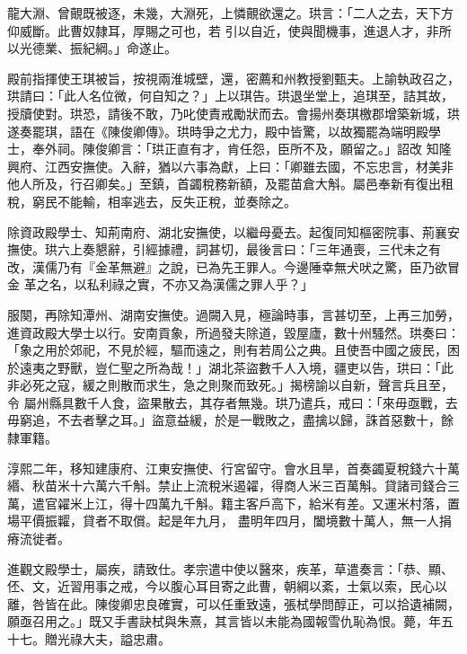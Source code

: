 \begin{pinyinscope}
 龍大淵、曾覿既被逐，未幾，大淵死，上憐覿欲還之。珙言：「二人之去，天下方仰威斷。此曹奴隸耳，厚賜之可也，若
 引以自近，使與聞機事，進退人才，非所以光德業、振紀綱。」命遂止。



 殿前指揮使王琪被旨，按視兩淮城壁，還，密薦和州教授劉甄夫。上諭執政召之，珙請曰：「此人名位微，何自知之？」上以琪告。珙退坐堂上，追琪至，詰其故，授牘使對。珙恐，請後不敢，乃叱使責戒勵狀而去。會揚州奏琪檄郡增築新城，珙遂奏罷琪，語在《陳俊卿傳》。珙時爭之尤力，殿中皆驚，以故獨罷為端明殿學士，奉外祠。陳俊卿言：「珙正直有才，肯任怨，臣所不及，願留之。」詔改
 知隆興府、江西安撫使。入辭，猶以六事為獻，上曰：「卿雖去國，不忘忠言，材美非他人所及，行召卿矣。」至鎮，首蠲稅務新額，及罷苗倉大斛。屬邑奉新有復出租稅，窮民不能輸，相率逃去，反失正稅，並奏除之。



 除資政殿學士、知荊南府、湖北安撫使，以繼母憂去。起復同知樞密院事、荊襄安撫使。珙六上奏懇辭，引經據禮，詞甚切，最後言曰：「三年通喪，三代未之有改，漢儒乃有『金革無避』之說，已為先王罪人。今邊陲幸無犬吠之驚，臣乃欲冒金
 革之名，以私利祿之實，不亦又為漢儒之罪人乎？」



 服闋，再除知潭州、湖南安撫使。過闕入見，極論時事，言甚切至，上再三加勞，進資政殿大學士以行。安南貢象，所過發夫除道，毀屋廬，數十州騷然。珙奏曰：「象之用於郊祀，不見於經，驅而遠之，則有若周公之典。且使吾中國之疲民，困於遠夷之野獸，豈仁聖之所為哉！」湖北茶盜數千人入境，疆吏以告，珙曰：「此非必死之寇，緩之則散而求生，急之則聚而致死。」揭榜諭以自新，聲言兵且至，令
 屬州縣具數千人食，盜果散去，其存者無幾。珙乃遣兵，戒曰：「來毋亟戰，去毋窮追，不去者擊之耳。」盜意益緩，於是一戰敗之，盡擒以歸，誅首惡數十，餘隸軍籍。



 淳熙二年，移知建康府、江東安撫使、行宮留守。會水且旱，首奏蠲夏稅錢六十萬緡、秋苗米十六萬六千斛。禁止上流稅米遏糴，得商人米三百萬斛。貸諸司錢合三萬，遣官糴米上江，得十四萬九千斛。籍主客戶高下，給米有差。又運米村落，置場平價振糶，貸者不取償。起是年九月，
 盡明年四月，闔境數十萬人，無一人捐瘠流徙者。



 進觀文殿學士，屬疾，請致仕。孝宗遣中使以醫來，疾革，草遣奏言：「恭、顯、伾、文，近習用事之戒，今以腹心耳目寄之此曹，朝綱以紊，士氣以索，民心以離，咎皆在此。陳俊卿忠良確實，可以任重致遠，張栻學問醇正，可以拾遺補闕，願亟召用之。」既又手書訣栻與朱熹，其言皆以未能為國報雪仇恥為恨。薨，年五十七。贈光祿大夫，謚忠肅。




\end{pinyinscope}
